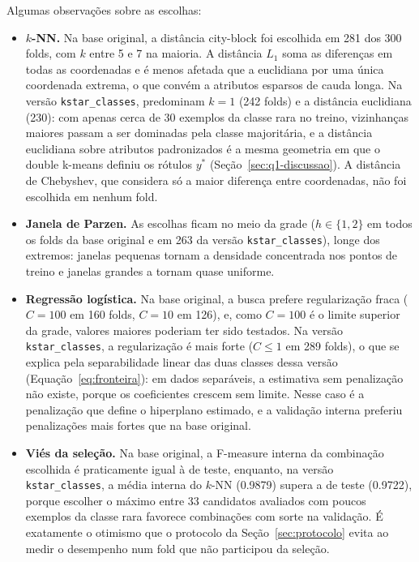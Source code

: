 \documentclass[11pt,a4paper]{article}
\begin{document}
Algumas observações sobre as escolhas:
\begin{itemize}
\item \textbf{$k$-NN.} Na base original, a distância city-block foi escolhida em 281 dos 300 folds, com $k$ entre 5 e 7 na maioria. 
  A distância $L_1$ soma as diferenças em todas as coordenadas e é menos afetada que a euclidiana por uma única coordenada extrema, o que convém 
  a atributos esparsos de cauda longa. Na versão \texttt{kstar\_classes}, predominam $k=1$ (242 folds) e a distância euclidiana (230): com apenas 
  cerca de 30 exemplos da classe rara no treino, vizinhanças maiores passam a ser dominadas pela classe majoritária, e a distância euclidiana sobre 
  atributos padronizados é a mesma geometria em que o double k-means definiu os rótulos $y^*$ (Seção~\ref{sec:q1-discussao}). A distância de Chebyshev, 
  que considera só a maior diferença entre coordenadas, não foi escolhida em nenhum fold.
\item \textbf{Janela de Parzen.} As escolhas ficam no meio da grade ($h\in\{1,2\}$ em todos os folds da base original e em 263 da 
  versão \texttt{kstar\_classes}), longe dos extremos: janelas pequenas tornam a densidade concentrada nos pontos de treino e janelas
  grandes a tornam quase uniforme.
\item \textbf{Regressão logística.} Na base original, a busca prefere regularização fraca ($C=100$ em 160 folds, $C=10$ em 126), e, como $C=100$ é 
  o limite superior da grade, valores maiores poderiam ter sido testados. Na versão \texttt{kstar\_classes}, a regularização é mais 
  forte ($C\le1$ em 289 folds), o que se explica pela separabilidade linear das duas classes dessa versão (Equação~\ref{eq:fronteira}): 
  em dados separáveis, a estimativa sem penalização não existe, porque os coeficientes crescem sem limite. Nesse caso é a penalização que define 
  o hiperplano estimado, e a validação interna preferiu penalizações mais fortes que na base original.
\item \textbf{Viés da seleção.} Na base original, a F-measure interna da combinação escolhida é praticamente igual à de teste, enquanto, 
  na versão \texttt{kstar\_classes}, a média interna do $k$-NN (\num{0.9879}) supera a de teste (\num{0.9722}), porque escolher o máximo 
  entre 33 candidatos avaliados com poucos exemplos da classe rara favorece combinações com sorte na validação. É exatamente o otimismo que o 
  protocolo da Seção~\ref{sec:protocolo} evita ao medir o desempenho num fold que não participou da seleção.
\end{itemize}
\end{document}
